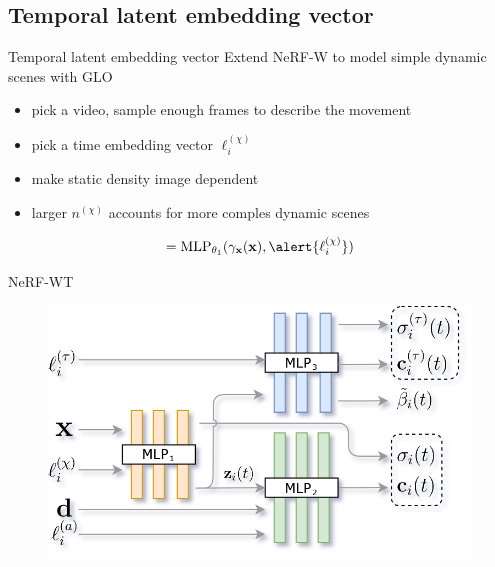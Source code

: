 \documentclass[aspectratio=1610]{beamer}
\begin{document}
\subsection{Temporal latent embedding vector}
\begin{frame}{Temporal latent embedding vector}
    Extend NeRF-W to model simple dynamic scenes with GLO 
    \bigskip
    \begin{figure}
    \end{figure}
    \begin{itemize}
        \item pick a video, sample enough frames to describe the movement
        \item pick a time embedding vector \(\ell_i^{(\chi)}\) 
        \item make static density image dependent
        \item larger \(n^{(\chi)}\) accounts for more comples dynamic scenes 
    \end{itemize}
    \bigskip
    \begin{equation*}
        [\sigma_i(t), \vb{z}_i(t)] = \textrm{MLP}_{\theta_1} (\gamma_{\vb{x}}(\vb{x}), \alert{\ell_i^{(\chi)}})
    \end{equation*}    
\end{frame}

\begin{frame}{NeRF-WT}
    
    \begin{figure}
        \includegraphics[width=.7\textwidth]{nerfwt-architecture.png}
    \end{figure}
\end{frame}
\end{document}
